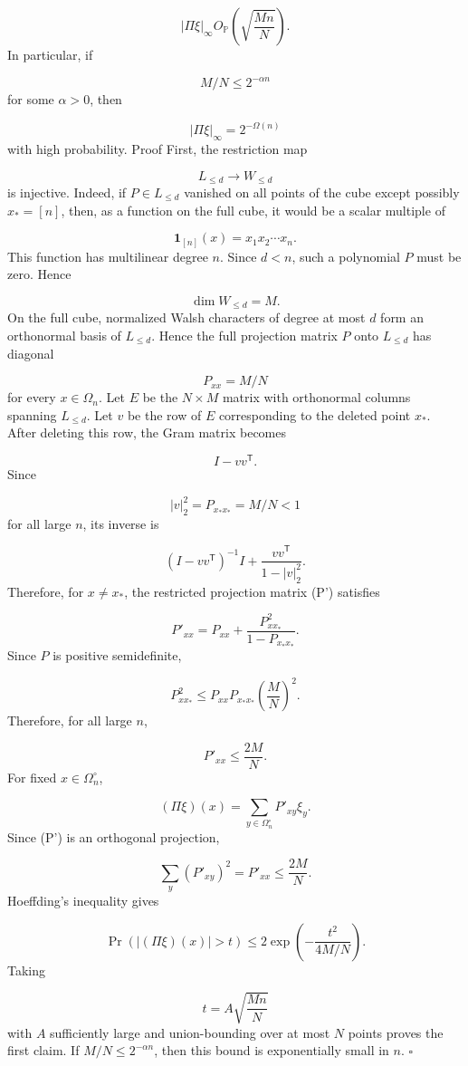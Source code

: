 \documentclass[11pt]{article}
\theoremstyle{definition}
\begin{document}
\[
|\Pi\xi|_\infty
O_{\mathbb{P}}
\left(
\sqrt{\frac{Mn}{N}}
\right).
\]
In particular, if

\[
M/N\le2^{-\alpha n}
\]
for some $\alpha>0$, then

\[
|\Pi\xi|_\infty=2^{-\Omega(n)}
\]
with high probability. Proof First, the restriction map

\[
L_{\le d}\to W_{\le d}
\]
is injective. Indeed, if $P\in L_{\le d}$ vanished on all points of the cube except possibly $x_*=[n]$, then, as a function on the full cube, it would be a scalar multiple of

\[
\mathbf 1_{{[n]}}(x)=x_1x_2\cdots x_n.
\]
This function has multilinear degree $n$. Since $d<n$, such a polynomial $P$ must be zero. Hence

\[
\dim W_{\le d}=M.
\]
On the full cube, normalized Walsh characters of degree at most $d$ form an orthonormal basis of $L_{\le d}$. Hence the full projection matrix $P$ onto $L_{\le d}$ has diagonal

\[
P_{xx}=M/N
\]
for every $x\in\Omega_n$. Let $E$ be the $N\times M$ matrix with orthonormal columns spanning $L_{\le d}$. Let $v$ be the row of $E$ corresponding to the deleted point $x_*$. After deleting this row, the Gram matrix becomes

\[
I-vv^{\mathsf{T}}.
\]
Since

\[
|v|_2^2=P_{x_*x_*}=M/N<1
\]
for all large $n$, its inverse is

\[
(I-vv^{\mathsf{T}})^{-1}
I+\frac{vv^{\mathsf{T}}}{1-|v|_2^2}.
\]
Therefore, for $x\ne x_*$, the restricted projection matrix (P') satisfies

\[
P'_{xx}
=
P_{xx}
+
\frac{P_{xx_*}^2}{1-P_{x_*x_*}}.
\]
Since $P$ is positive semidefinite,

\[
P_{xx_*}^2
\le
P_{xx}P_{x_*x_*}
\left(\frac MN\right)^2.
\]
Therefore, for all large $n$,

\[
P'_{xx}\le \frac{2M}{N}.
\]
For fixed $x\in\Omega_n^\circ$,

\[
(\Pi\xi)(x)=\sum_{y\in\Omega_n^\circ}P'_{xy}\xi_y.
\]
Since (P') is an orthogonal projection,

\[
\sum_y(P'_{xy})^2=P'_{xx}\le\frac{2M}{N}.
\]
Hoeffding's inequality gives

\[
\Pr\left(|(\Pi\xi)(x)|>t\right)
\le
2\exp\left(-\frac{t^2}{4M/N}\right).
\]
Taking

\[
t=A\sqrt{\frac{Mn}{N}}
\]
with $A$ sufficiently large and union-bounding over at most $N$ points proves the first claim. If $M/N\le2^{-\alpha n}$, then this bound is exponentially small in $n$. $\square$
\end{document}
